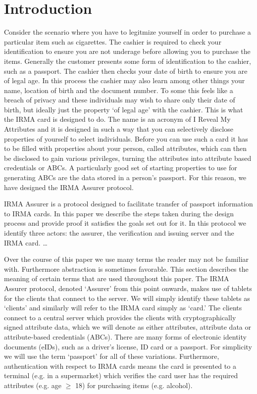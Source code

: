 \section{Introduction}
Consider the scenario where you have to legitmize yourself in order to purchase a particular item such as cigarettes. The cashier is required to check your identification to ensure you are not underage before allowing you to purchase the items. Generally the customer presents some form of identification to the cashier, such as a passport. The cashier then checks your date of birth to ensure you are of legal age. In this process the cashier may also learn among other things your name, location of birth and the document number. To some this feels like a breach of privacy and these individuals may wish to share only their date of birth, but ideally just the property `of legal age' with the cashier. This is what the IRMA card is designed to do. The name is an acronym of I Reveal My Attributes and it is designed in such a way that you can selectively disclose properties of yourself to select individuals. Before you can use such a card it has to be filled with properties about your person, called attributes, which can then be disclosed to gain various privileges, turning the attributes into attribute based credentials or ABCs. A particularly good set of starting properties to use for generating ABCs are the data stored in a person's passport. For this reason, we have designed the IRMA Assurer protocol.

IRMA Assurer is a protocol designed to facilitate transfer of passport information to IRMA cards. In this paper we describe the steps taken during the design process and provide proof it satisfies the goals set out for it. In this protocol we identify three actors: the assurer, the verification and issuing server and the IRMA card. \ldots

Over the course of this paper we use many terms the reader may not be familiar with. Furthermore abstraction is sometimes favorable. This section describes the meaning of certain terms that are used throughout this paper. The IRMA Assurer protocol, denoted `Assurer' from this point onwards, makes use of tablets for the clients that connect to the server. We will simply identify these tablets as `clients' and similarly will refer to the IRMA card simply as `card.' The clients connect to a central server which provides the clients with cryptographically signed attribute data, which we will denote as either attributes, attribute data or attribute-based credentials (ABCs). There are many forms of electronic identity documents (eIDs), such as a driver's license, ID card or a passport. For simplicity we will use the term `passport' for all of these variations. Furthermore, authentication with respect to IRMA cards means the card is presented to a terminal (e.g. in a supermarket) which verifies the card user has the required attributes (e.g. age $\geq$ 18) for purchasing items (e.g. alcohol).

